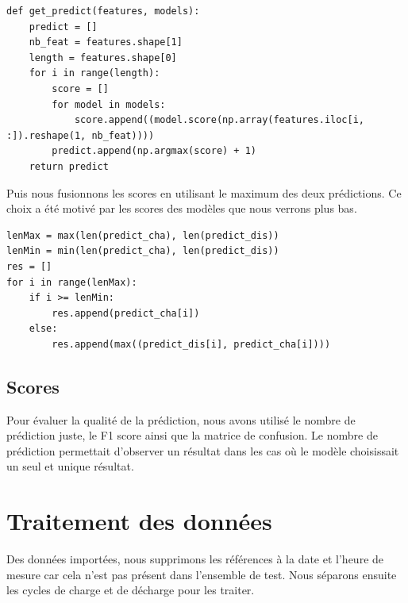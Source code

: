 \begin{verbatim}
def get_predict(features, models):
    predict = []
    nb_feat = features.shape[1]
    length = features.shape[0]
    for i in range(length):
        score = []
        for model in models:
            score.append((model.score(np.array(features.iloc[i, :]).reshape(1, nb_feat))))
        predict.append(np.argmax(score) + 1)
    return predict
\end{verbatim}

Puis nous fusionnons les scores en utilisant le maximum des deux prédictions.
Ce choix a été motivé par les scores des modèles que nous verrons plus bas.

\begin{verbatim}
lenMax = max(len(predict_cha), len(predict_dis))
lenMin = min(len(predict_cha), len(predict_dis))
res = []
for i in range(lenMax):
    if i >= lenMin:
        res.append(predict_cha[i])
    else:
        res.append(max((predict_dis[i], predict_cha[i])))
\end{verbatim}

\subsection{Scores}
Pour évaluer la qualité de la prédiction, nous avons utilisé le nombre de prédiction
juste, le F1 score ainsi que la matrice de confusion. Le nombre de prédiction
permettait d'observer un résultat dans les cas où le modèle choisissait un seul et
unique résultat.

\section{Traitement des données}
Des données importées, nous supprimons les références à la date et l'heure de mesure car cela n'est pas présent dans l'ensemble de test.
Nous séparons ensuite les cycles de charge et de décharge pour les traiter.

